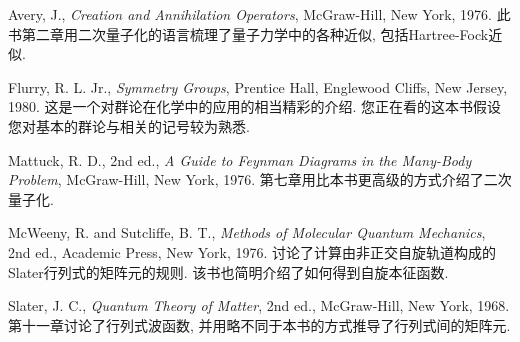 \indent Avery, J., \textit{Creation and Annihilation Operators}, McGraw-Hill, New York, 1976. 
此书第二章用二次量子化的语言梳理了量子力学中的各种近似, 包括Hartree-Fock近似.

Flurry, R. L. Jr., \textit{Symmetry Groups}, Prentice Hall, Englewood Cliffs, New Jersey, 1980. 
这是一个对群论在化学中的应用的相当精彩的介绍. 您正在看的这本书假设您对基本的群论与相关的记号较为熟悉.

Mattuck, R. D., 2nd ed., \textit{A Guide to Feynman Diagrams in the Many-Body Problem}, McGraw-Hill, New York, 1976. 
第七章用比本书更高级的方式介绍了二次量子化.

McWeeny, R. and Sutcliffe, B. T., \textit{Methods of Molecular Quantum Mechanics}, 2nd ed., Academic Press, New York, 1976. 
讨论了计算由非正交自旋轨道构成的Slater行列式的矩阵元的规则. 该书也简明介绍了如何得到自旋本征函数.

Slater, J. C., \textit{Quantum Theory of Matter}, 2nd ed., McGraw-Hill, New York, 1968. 
第十一章讨论了行列式波函数, 并用略不同于本书的方式推导了行列式间的矩阵元.
